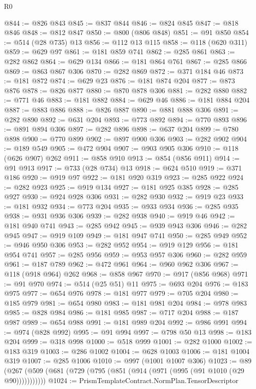 \begin{lexlean}{R0}
\begin{coremodule}
@844 := @826 @843
@845 := @837 @844
@846 := @824 @845
@847 := @818 @846
@848 := @812 @847
@850 := @800 (@806 @848)
@851 := @91 @850
@854 := @514 (@28 @735) @13
@856 := @112 @13 @115
@858 := @118 (@620 @311)
@859 := @629 @97
@861 := @181 @859 @741
@862 := @285 @861
@863 := @282 @862
@864 := @629 @134
@866 := @181 @864 @761
@867 := @285 @866
@869 := @863 @867 @306
@870 := @282 @869
@872 := @371 @184 @46
@873 := @181 @872
@874 := @629 @23
@876 := @181 @874 @204
@877 := @873 @876
@878 := @826 @877
@880 := @870 @878 @306
@881 := @282 @880
@882 := @771 @46
@883 := @181 @882
@884 := @629 @46
@886 := @181 @884 @204
@887 := @883 @886
@888 := @826 @887
@890 := @881 @888 @306
@891 := @282 @890
@892 := @631 @204
@893 := @773 @892
@894 := @770 @893
@896 := @891 @894 @306
@897 := @282 @896
@898 := @637 @204
@899 := @780 @898
@900 := @770 @899
@902 := @897 @900 @306
@903 := @282 @902
@904 := @189 @549
@905 := @472 @904
@907 := @903 @905 @306
@910 := @118 (@626 @907) @262
@911 := @858 @910
@913 := @854 (@856 @911)
@914 := @91 @913
@917 := @733 (@28 @734) @13
@918 := @624 @510
@919 := @371 @186
@920 := @919 @97
@922 := @181 @920 @319
@923 := @285 @922
@924 := @282 @923
@925 := @919 @134
@927 := @181 @925 @385
@928 := @285 @927
@930 := @924 @928 @306
@931 := @282 @930
@932 := @919 @23
@933 := @181 @932
@934 := @773 @204
@935 := @933 @934
@936 := @285 @935
@938 := @931 @936 @306
@939 := @282 @938
@940 := @919 @46
@942 := @181 @940 @741
@943 := @285 @942
@945 := @939 @943 @306
@946 := @282 @945
@947 := @919 @109
@949 := @181 @947 @741
@950 := @285 @949
@952 := @946 @950 @306
@953 := @282 @952
@954 := @919 @129
@956 := @181 @954 @741
@957 := @285 @956
@959 := @953 @957 @306
@960 := @282 @959
@961 := @187 @789
@962 := @472 @961
@964 := @960 @962 @306
@967 := @118 (@918 @964) @262
@968 := @858 @967
@970 := @917 (@856 @968)
@971 := @91 @970
@974 := @514 (@25 @51) @11
@975 := @693 @204
@976 := @183 @975
@977 := @654 @976
@978 := @181 @977
@979 := @705 @204
@980 := @185 @979
@981 := @654 @980
@983 := @181 @981 @204
@984 := @978 @983
@985 := @828 @984
@986 := @181 @985
@987 := @717 @204
@988 := @187 @987
@989 := @654 @988
@991 := @181 @989 @204
@992 := @986 @991
@994 := @974 (@828 @992)
@995 := @91 @994
@997 := @798 @50 @13
@998 := @183 @204
@999 := @318 @998
@1000 := @518 @999
@1001 := @282 @1000
@1002 := @183 @319
@1003 := @286 @1002
@1004 := @628 @1003
@1006 := @181 @1004 @319
@1007 := @285 @1006
@1010 := @997 (@1001 @1007 @306)
@1023 := @89 (@267 (@509 (@681 (@729 (@795 (@851 (@914 (@971 (@995 (@91 @1010 (@29 @90)))))))))))
@1024 := PrismTemplateContract.NormPlan.TensorDescriptor

\end{coremodule}
\end{lexlean}
